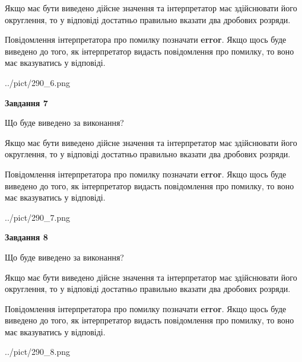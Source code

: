 \documentclass[12pt, ukrainian]{article}
\begin{document}
{\begin {Large}
Якщо має бути виведено дійсне значення та інтерпретатор має здійснювати його округлення, 
то у відповіді достатньо правильно вказати два дробових розряди.

Повідомлення інтерпретатора про помилку позначати \textbf{error}.
Якщо щось буде виведено до того, як інтерпретатор видасть повідомлення про помилку, 
то воно має вказуватись у відповіді. \par

\begin{center}
	{../pict/290_6.png}
\end{center}
\newpage

{\begin {center}\textbf{Завдання 7}\end {center}}\par
Що буде виведено за виконання? \par

Якщо має бути виведено дійсне значення та інтерпретатор має здійснювати його округлення, 
то у відповіді достатньо правильно вказати два дробових розряди.

Повідомлення інтерпретатора про помилку позначати \textbf{error}.
Якщо щось буде виведено до того, як інтерпретатор видасть повідомлення про помилку, 
то воно має вказуватись у відповіді. \par

\begin{center}
	{../pict/290_7.png}
\end{center}
\newpage

{\begin {center}\textbf{Завдання 8}\end {center}}\par
Що буде виведено за виконання? \par

Якщо має бути виведено дійсне значення та інтерпретатор має здійснювати його округлення, 
то у відповіді достатньо правильно вказати два дробових розряди.

Повідомлення інтерпретатора про помилку позначати \textbf{error}.
Якщо щось буде виведено до того, як інтерпретатор видасть повідомлення про помилку, 
то воно має вказуватись у відповіді. \par

\begin{center}
	{../pict/290_8.png}
\end{center}
\newpage


\end{Large}}
\end{document}
